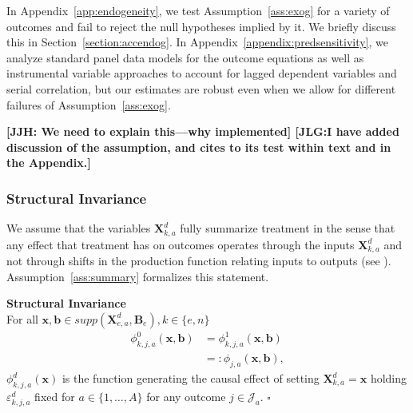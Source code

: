 In Appendix~\ref{app:endogeneity}, we test Assumption~\ref{ass:exog} for a variety of outcomes and fail to reject the null hypotheses implied by it. We briefly discuss this in Section~\ref{section:accendog}. In  Appendix~\ref{appendix:predsensitivity}, we analyze standard panel data models for the outcome equations as well as instrumental variable approaches to account for lagged dependent variables and serial correlation, but our estimates are robust even when we allow for different failures of Assumption~\ref{ass:exog}.  

\noindent \textbf{[JJH: We need to explain this---why implemented] [JLG:I have added discussion of the assumption, and cites to its test within text and in the Appendix.]}

\subsubsection{Structural Invariance}

We assume that the variables $\bm{X}_{k,a}^d$ fully summarize treatment in the sense that any effect that treatment has on outcomes operates through the inputs $\bm{X}_{k,a}^d$ and not through shifts in the production function relating inputs to outputs (see \citealp{Heckman_Pinto_etal_2013_PerryFactor}). Assumption~\ref{ass:summary} formalizes this statement.

\onehalfspacing
\begin{assumption} \label{ass:summary} \textbf{Structural Invariance}\\
For all $\bm{x}, \bm{b} \in supp(\bm{X}^d_{e,a}, \bm{B}_e), k \in \{e,n\}$
\begin{align}
\phi_{k,j,a}^0 \left( \bm{x}, \bm{b} \right) &= \phi_{k,j,a}^1 (\bm{x}, \bm{b}) \\   \nonumber
                                                                     &=: \phi_{j,a} (\bm{x}, \bm{b}),
\end{align}
$\phi^d_{k,j,a}(\bm{x})$ is the function generating the causal effect of setting $\bm{X}^d_{k,a}=\bm{x}$ holding $\varepsilon^d_{k,j,a}$ fixed for $a \in \{1,\dots,A\}$ for any outcome $j \in \mathcal{J}_{a}$. $\square$
\end{assumption}
\doublespacing

